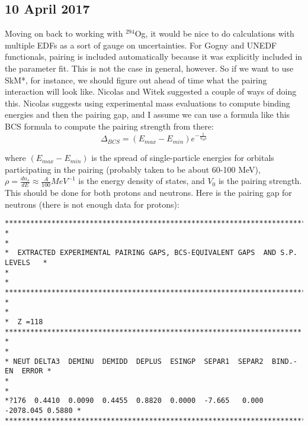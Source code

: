 \documentclass[]{report}
\begin{document}
\subsection*{10 April 2017}
Moving on back to working with $^{294}$Og, it would be nice to do calculations with multiple EDFs as a sort of gauge on uncertainties. For Gogny and UNEDF functionals, pairing is included automatically because it was explicitly included in the parameter fit. This is not the case in general, however. So if we want to use SkM*, for instance, we should figure out ahead of time what the pairing interaction will look like. Nicolas and Witek suggested a couple of ways of doing this. Nicolas suggests using experimental mass evaluations to compute binding energies and then the pairing gap, and I assume we can use a formula like this BCS formula to compute the pairing strength from there:
\begin{equation}
\Delta_{BCS} = (E_{max}-E_{min})e^{-\frac{1}{V_0\rho}}
\end{equation}

\noindent where $(E_{max}-E_{min})$ is the spread of single-particle energies for orbitals participating in the pairing (probably taken to be about 60-100 MeV), $\rho = \frac{dn_s}{dE} \approx \frac{A}{100} MeV^{-1}$ is the energy density of states, and $V_0$ is the pairing strength. This should be done for both protons and neutrons. Here is the pairing gap for neutrons (there is not enough data for protons):

\begin{verbatim}
********************************************************************************
*                                                                              *
*  EXTRACTED EXPERIMENTAL PAIRING GAPS, BCS-EQUIVALENT GAPS  AND S.P. LEVELS   *
*                                                                              *
********************************************************************************
*                                                                              *
*  Z =118 **********************************************************************
*                                                                              *
* NEUT DELTA3  DEMINU  DEMIDD  DEPLUS  ESINGP  SEPAR1  SEPAR2  BIND.-EN  ERROR *
*                                                                              *
*?176  0.4410  0.0090  0.4455  0.8820  0.0000  -7.665   0.000 -2078.045 0.5880 *
********************************************************************************
\end{verbatim}
\end{document}
